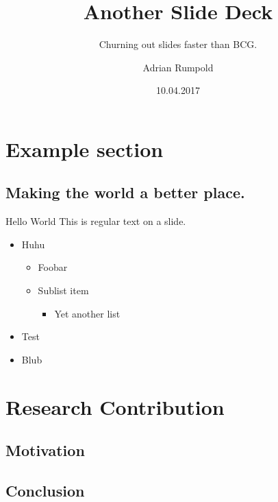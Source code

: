 \documentclass{beamer}
\author{Adrian Rumpold}
\title{Another Slide Deck}
\subtitle{Churning out slides faster than BCG.}
\institute{Institute for Applied Beer Brewing, University of Augsburg}
\date{10.04.2017}
\begin{document}
\begin{frame}[plain]
  \titlepage
\end{frame}

\section{Example section}
\subsection{Making the world a better place.}
\begin{frame}{Hello World}
  This is regular text on a slide.
  
  \begin{itemize}
  \item Huhu
    \begin{itemize}
    \item Foobar
    \item Sublist item
      \begin{itemize}
      \item Yet another list
      \end{itemize}
    \end{itemize}
  \item Test
  \item Blub
  \end{itemize}
\end{frame}

\section{Research Contribution}
\subsection{Motivation}

\subsection{Conclusion}
\end{document}
